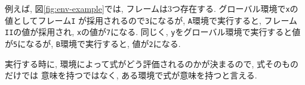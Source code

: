 例えば, 図\ref{fig:env-example}では, フレームは3つ存在する.
グローバル環境で\lstinline{x}の値としてフレーム\lstinline{I}
が採用されるので\lstinline{3}になるが, \lstinline{A}環境で実行すると,
フレーム\lstinline{II}の値が採用され, \lstinline{x}の値が\lstinline{7}になる.
同じく, \lstinline{y}をグローバル環境で実行すると値が\lstinline{5}になるが,
\lstinline{B}環境で実行すると, 値が\lstinline{2}になる.

実行する時に, 環境によって式がどう評価されるのかが決まるので, 式そのものだけでは
意味を持つではなく, ある環境で式が意味を持つと言える.
%
